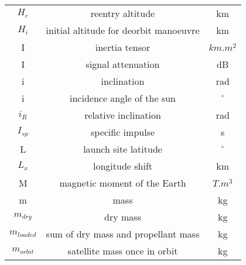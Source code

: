 \begin{center}
\begin{longtable}{c|c|c}
$H_e$                               & reentry altitude     																										& km \\

$H_i$                               & initial altitude for deorbit manoeuvre     															& km \\

I                                   & inertia tensor                          																& $km.m^2$ \\

I                                   & signal attenuation                         															& dB \\

i 																	& inclination 																														& rad \\

i                                   & incidence angle of the sun                 															& $^\circ$ \\

$i_R$ 															& relative inclination 																										& rad \\

$I_{sp}$													 	& specific impulse 																												& s \\

L                                   & launch site latitude                        														& $^\circ$ \\

$L_x$                               & longitude shift                               													& km \\

M                                   & magnetic moment of the Earth                 														& $T.m^3$ \\

m 																	& mass 																																		& kg \\

$m_{dry}$                           & dry mass                                    														& kg \\

$m_{loaded}$												& sum of dry mass and propellant mass																			& kg \\

$m_{orbit}$                         & satellite mass once in orbit                														& kg \\


\end{longtable}
\end{center}
